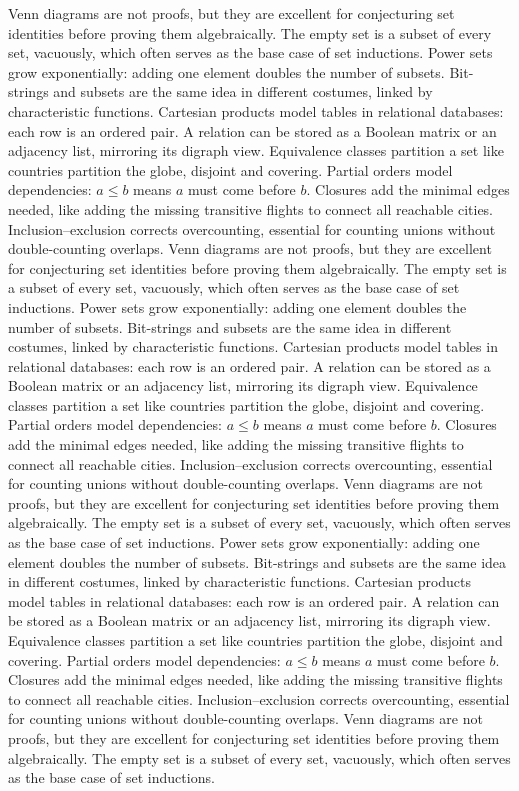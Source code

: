 Venn diagrams are not proofs, but they are excellent for conjecturing set identities before proving them algebraically.
The empty set is a subset of every set, vacuously, which often serves as the base case of set inductions.
Power sets grow exponentially: adding one element doubles the number of subsets.
Bit-strings and subsets are the same idea in different costumes, linked by characteristic functions.
Cartesian products model tables in relational databases: each row is an ordered pair.
A relation can be stored as a Boolean matrix or an adjacency list, mirroring its digraph view.
Equivalence classes partition a set like countries partition the globe, disjoint and covering.
Partial orders model dependencies: $a\le b$ means $a$ must come before $b$.
Closures add the minimal edges needed, like adding the missing transitive flights to connect all reachable cities.
Inclusion--exclusion corrects overcounting, essential for counting unions without double-counting overlaps.
Venn diagrams are not proofs, but they are excellent for conjecturing set identities before proving them algebraically.
The empty set is a subset of every set, vacuously, which often serves as the base case of set inductions.
Power sets grow exponentially: adding one element doubles the number of subsets.
Bit-strings and subsets are the same idea in different costumes, linked by characteristic functions.
Cartesian products model tables in relational databases: each row is an ordered pair.
A relation can be stored as a Boolean matrix or an adjacency list, mirroring its digraph view.
Equivalence classes partition a set like countries partition the globe, disjoint and covering.
Partial orders model dependencies: $a\le b$ means $a$ must come before $b$.
Closures add the minimal edges needed, like adding the missing transitive flights to connect all reachable cities.
Inclusion--exclusion corrects overcounting, essential for counting unions without double-counting overlaps.
Venn diagrams are not proofs, but they are excellent for conjecturing set identities before proving them algebraically.
The empty set is a subset of every set, vacuously, which often serves as the base case of set inductions.
Power sets grow exponentially: adding one element doubles the number of subsets.
Bit-strings and subsets are the same idea in different costumes, linked by characteristic functions.
Cartesian products model tables in relational databases: each row is an ordered pair.
A relation can be stored as a Boolean matrix or an adjacency list, mirroring its digraph view.
Equivalence classes partition a set like countries partition the globe, disjoint and covering.
Partial orders model dependencies: $a\le b$ means $a$ must come before $b$.
Closures add the minimal edges needed, like adding the missing transitive flights to connect all reachable cities.
Inclusion--exclusion corrects overcounting, essential for counting unions without double-counting overlaps.
Venn diagrams are not proofs, but they are excellent for conjecturing set identities before proving them algebraically.
The empty set is a subset of every set, vacuously, which often serves as the base case of set inductions.

